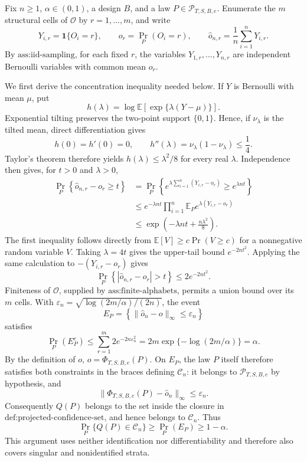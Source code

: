 Fix \(n\geq 1\), \(\alpha\in(0,1)\), a design \(B\), and a law \(P\in\mathcal P_{T,S,B,e}\).  Enumerate the \(m\) structural cells of \(\mathcal O\) by \(r=1,\ldots,m\), and write
\[
Y_{i,r}=\mathbf 1\{O_i=r\},\qquad
o_r=\Pr_P(O_i=r),\qquad
\widehat o_{n,r}=\frac1n\sum_{i=1}^nY_{i,r}.
\]
By \(\text{ass:iid-sampling}\), for each fixed \(r\), the variables \(Y_{1,r},\ldots,Y_{n,r}\) are independent Bernoulli variables with common mean \(o_r\).

We first derive the concentration inequality needed below.  If \(Y\) is Bernoulli with mean \(\mu\), put
\[
h(\lambda)=\log\mathbb E\!\left[\exp\{\lambda(Y-\mu)\}\right].
\]
Exponential tilting preserves the two-point support \(\{0,1\}\).  Hence, if \(\nu_\lambda\) is the tilted mean, direct differentiation gives
\[
h(0)=h'(0)=0,
\qquad
h''(\lambda)=\nu_\lambda(1-\nu_\lambda)\leq\frac14.
\]
Taylor's theorem therefore yields \(h(\lambda)\leq\lambda^2/8\) for every real \(\lambda\).  Independence then gives, for \(t>0\) and \(\lambda>0\),
\[
\begin{aligned}
\Pr_P\!\left\{\widehat o_{n,r}-o_r\geq t\right\}
&=\Pr_P\!\left\{e^{\lambda\sum_{i=1}^n(Y_{i,r}-o_r)}\geq e^{\lambda nt}\right\}\\
&\leq e^{-\lambda nt}\prod_{i=1}^n
  \mathbb E_P e^{\lambda(Y_{i,r}-o_r)}\\
&\leq \exp\!\left(-\lambda nt+\frac{n\lambda^2}{8}\right).
\end{aligned}
\]
The first inequality follows directly from
\(\mathbb E[V]\geq c\Pr(V\geq c)\) for a nonnegative random variable \(V\).  Taking \(\lambda=4t\) gives the upper-tail bound \(e^{-2nt^2}\).  Applying the same calculation to \(-(Y_{i,r}-o_r)\) gives
\[
\Pr_P\!\left\{|\widehat o_{n,r}-o_r|>t\right\}
\leq 2e^{-2nt^2}.
\]
Finiteness of \(\mathcal O\), supplied by \(\text{ass:finite-alphabets}\), permits a union bound over its \(m\) cells.  With \(\varepsilon_n=\sqrt{\log(2m/\alpha)/(2n)}\), the event
\[
E_P=\left\{\|\widehat o_n-o\|_\infty\leq\varepsilon_n\right\}
\]
satisfies
\[
\Pr_P(E_P^c)
\leq\sum_{r=1}^m2e^{-2n\varepsilon_n^2}
=2m\exp\{-\log(2m/\alpha)\}
=\alpha.
\]
By the definition of \(o\), \(o=\Phi_{T,S,B,e}(P)\).  On \(E_P\), the law \(P\) itself therefore satisfies both constraints in the braces defining \(\mathcal C_n\): it belongs to \(\mathcal P_{T,S,B,e}\) by hypothesis, and
\[
\|\Phi_{T,S,B,e}(P)-\widehat o_n\|_\infty\leq\varepsilon_n.
\]
Consequently \(Q(P)\) belongs to the set inside the closure in \(\text{def:projected-confidence-set}\), and hence belongs to \(\mathcal C_n\).  Thus
\[
\Pr_P\{Q(P)\in\mathcal C_n\}
\geq\Pr_P(E_P)
\geq1-\alpha.
\]
This argument uses neither identification nor differentiability and therefore also covers singular and nonidentified strata.

